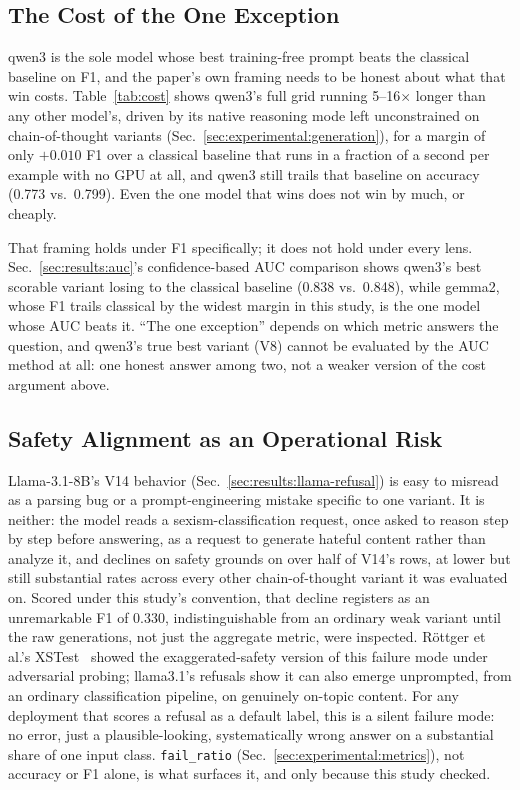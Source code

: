 \subsection{The Cost of the One Exception}
\label{sec:discussion:qwen3-cost}

qwen3 is the sole model whose best training-free prompt beats the
classical baseline on F1, and the paper's own framing needs to be honest
about what that win costs. Table~\ref{tab:cost} shows qwen3's full grid
running 5--16$\times$ longer than any other model's, driven by its
native reasoning mode left unconstrained on chain-of-thought variants
(Sec.~\ref{sec:experimental:generation}), for a margin of only $+0.010$
F1 over a classical baseline that runs in a fraction of a second per
example with no GPU at all, and qwen3 still trails that baseline on
accuracy (0.773 vs.\ 0.799). Even the one model that wins does not win
by much, or cheaply.

That framing holds under F1 specifically; it does not hold under every
lens. Sec.~\ref{sec:results:auc}'s confidence-based AUC comparison shows
qwen3's best scorable variant losing to the classical baseline (0.838
vs.\ 0.848), while gemma2, whose F1 trails classical by the widest
margin in this study, is the one model whose AUC beats it. ``The one
exception'' depends on which metric answers the question, and qwen3's
true best variant (V8) cannot be evaluated by the AUC method at all:
one honest answer among two, not a weaker version of the cost argument
above.

\subsection{Safety Alignment as an Operational Risk}
\label{sec:discussion:refusal}

Llama-3.1-8B's V14 behavior (Sec.~\ref{sec:results:llama-refusal}) is
easy to misread as a parsing bug or a prompt-engineering mistake specific
to one variant. It is neither: the model reads a sexism-classification
request, once asked to reason step by step before answering, as a
request to generate hateful content rather than analyze it, and declines
on safety grounds on over half of V14's rows, at lower but still
substantial rates across every other chain-of-thought variant it was
evaluated on. Scored under this study's convention, that decline
registers as an unremarkable F1 of 0.330, indistinguishable from an
ordinary weak variant until the raw generations, not just the aggregate
metric, were inspected. Röttger et al.'s
XSTest~\cite{rottger2023xstest} showed the exaggerated-safety version
of this failure mode under adversarial
probing; llama3.1's refusals show it can also emerge unprompted, from an
ordinary classification pipeline, on genuinely on-topic content. For any
deployment that scores a refusal as a default label, this is a silent
failure mode: no error, just a plausible-looking, systematically wrong
answer on a substantial share of one input class.
\texttt{fail\_ratio} (Sec.~\ref{sec:experimental:metrics}), not accuracy
or F1 alone, is what surfaces it, and only because this study checked.

